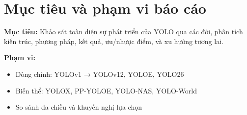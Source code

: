 \section{Mục tiêu và phạm vi báo cáo}

\textbf{Mục tiêu:} Khảo sát toàn diện sự phát triển của YOLO qua các đời, phân tích kiến trúc, phương pháp, kết quả, ưu/nhược điểm, và xu hướng tương lai.

\textbf{Phạm vi:}
\begin{itemize}
    \item Dòng chính: YOLOv1 → YOLOv12, YOLOE, YOLO26
    \item Biến thể: YOLOX, PP-YOLOE, YOLO-NAS, YOLO-World
    \item So sánh đa chiều và khuyến nghị lựa chọn
\end{itemize}
